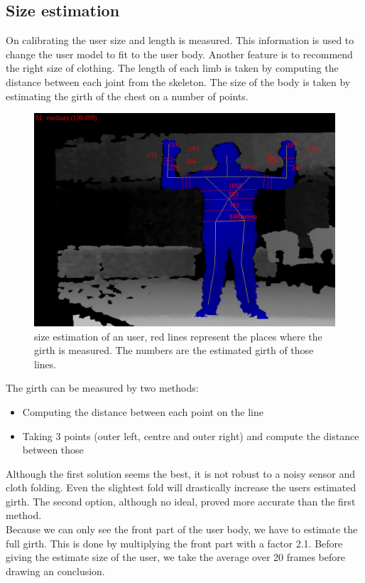 \documentclass[a4paper]{article}
\begin{document}
\subsection{Size estimation}
\label{sec:size_estimation}
On calibrating the user size and length is measured. This information is used to change the user model to fit to the user body. Another feature is to recommend the right size of clothing. The length of each limb is taken by computing the distance between each joint from the skeleton.
The size of the body is taken by estimating the girth of the chest on a number of points.
\begin{figure}[htp]
\centering
\includegraphics[scale=0.3]{size_estimation.png} 
\caption{size estimation of an user, red lines represent the places where the girth is measured. The numbers are the estimated girth of those lines.}
\label{fig:size_estimation}
\end{figure}
The girth can be measured by two methods:
\begin{itemize}
\item Computing the distance between each point on the line
\item Taking 3 points (outer left, centre and outer right) and compute the distance between those
\end{itemize}
Although the first solution seems the best, it is not robust to a noisy sensor and cloth folding. Even the slightest fold will drastically increase the users estimated girth.
The second option, although no ideal, proved more accurate than the first method.
\\
Because we can only see the front part of the user body, we have to estimate the full girth. This is done by multiplying the front part with a factor 2.1.
Before giving the estimate size of the user, we take the average over 20 frames before drawing an conclusion.
\end{document}
